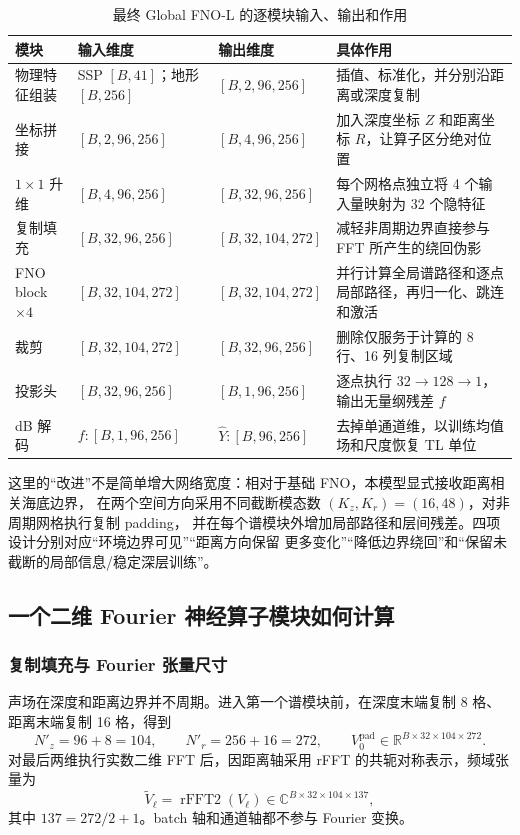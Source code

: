 \documentclass[UTF8,11pt]{ctexart}
\begin{document}
\begin{table}[H]
\centering
\caption{最终 Global FNO-L 的逐模块输入、输出和作用}
\label{tab:tensor-contract}
\begin{tabularx}{\textwidth}{L{2.7cm}L{3.1cm}L{3.1cm}Y}
\toprule
模块 & 输入维度 & 输出维度 & 具体作用 \\
\midrule
物理特征组装 & SSP $[B,41]$；地形 $[B,256]$ & $[B,2,96,256]$ &
插值、标准化，并分别沿距离或深度复制 \\
坐标拼接 & $[B,2,96,256]$ & $[B,4,96,256]$ &
加入深度坐标 $Z$ 和距离坐标 $R$，让算子区分绝对位置 \\
$1\times1$ 升维 & $[B,4,96,256]$ & $[B,32,96,256]$ &
每个网格点独立将 4 个输入量映射为 32 个隐特征 \\
复制填充 & $[B,32,96,256]$ & $[B,32,104,272]$ &
减轻非周期边界直接参与 FFT 所产生的绕回伪影 \\
FNO block $\times4$ & $[B,32,104,272]$ & $[B,32,104,272]$ &
并行计算全局谱路径和逐点局部路径，再归一化、跳连和激活 \\
裁剪 & $[B,32,104,272]$ & $[B,32,96,256]$ &
删除仅服务于计算的 8 行、16 列复制区域 \\
投影头 & $[B,32,96,256]$ & $[B,1,96,256]$ &
逐点执行 $32\rightarrow128\rightarrow1$，输出无量纲残差 $f$ \\
dB 解码 & $f:[B,1,96,256]$ & $\hat Y:[B,96,256]$ &
去掉单通道维，以训练均值场和尺度恢复 TL 单位 \\
\bottomrule
\end{tabularx}
\end{table}

这里的“改进”不是简单增大网络宽度：相对于基础 FNO，本模型显式接收距离相关海底边界，
在两个空间方向采用不同截断模态数 $(K_z,K_r)=(16,48)$，对非周期网格执行复制 padding，
并在每个谱模块外增加局部路径和层间残差。四项设计分别对应“环境边界可见”“距离方向保留
更多变化”“降低边界绕回”和“保留未截断的局部信息/稳定深层训练”。

\subsection{一个二维 Fourier 神经算子模块如何计算}

\subsubsection{复制填充与 Fourier 张量尺寸}

声场在深度和距离边界并不周期。进入第一个谱模块前，在深度末端复制 8 格、距离末端复制
16 格，得到
\begin{equation}
  N'_z=96+8=104,\qquad N'_r=256+16=272,\qquad
  V_0^{\mathrm{pad}}\in\mathbb{R}^{B\times32\times104\times272}.
\end{equation}
对最后两维执行实数二维 FFT 后，因距离轴采用 rFFT 的共轭对称表示，频域张量为
\begin{equation}
  \widetilde V_\ell=\operatorname{rFFT2}(V_\ell)
  \in\mathbb{C}^{B\times32\times104\times137},
\end{equation}
其中 $137=272/2+1$。batch 轴和通道轴都不参与 Fourier 变换。
\end{document}
